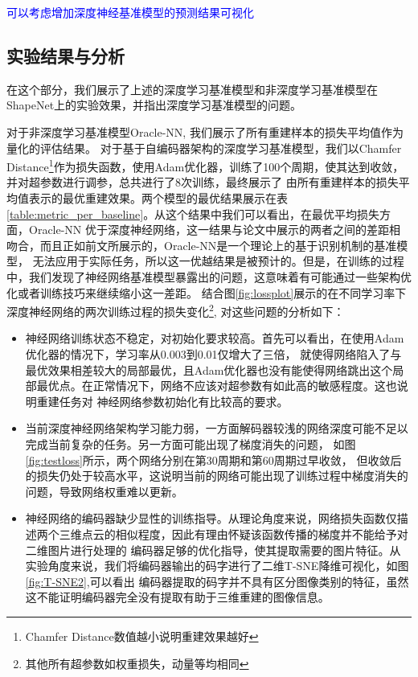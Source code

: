 \documentclass[bachelor, nocolorlinks, printoneside]{seuthesis} %
\newcommand\TODO[1]{\textcolor{blue}{#1}}
\begin{document}
\begin{Main}
\TODO{可以考虑增加深度神经基准模型的预测结果可视化}
\subsection{实验结果与分析}

在这个部分，我们展示了上述的深度学习基准模型和非深度学习基准模型在ShapeNet上的实验效果，并指出深度学习基准模型的问题。

对于非深度学习基准模型Oracle-NN, 我们展示了所有重建样本的损失平均值作为量化的评估结果。
对于基于自编码器架构的深度学习基准模型，我们以Chamfer Distance\footnote[2]{Chamfer Distance数值越小说明重建效果越好}作为损失函数，使用Adam优化器，训练了100个周期，使其达到收敛，并对超参数进行调参，总共进行了8次训练，最终展示了
由所有重建样本的损失平均值表示的最优重建效果。两个模型的最优结果展示在表\ref{table:metric_per_baseline}。从这个结果中我们可以看出，在最优平均损失方面，Oracle-NN
优于深度神经网络，这一结果与论文\cite{tatarchenko2019single}中展示的两者之间的差距相吻合，而且正如前文所展示的，Oracle-NN是一个理论上的基于识别机制的基准模型，
无法应用于实际任务，所以这一优越结果是被预计的。但是，在训练的过程中，我们发现了神经网络基准模型暴露出的问题，这意味着有可能通过一些架构优化或者训练技巧来继续缩小这一差距。
结合图\ref{fig:lossplot}展示的在不同学习率下深度神经网络的两次训练过程的损失变化\footnote[1]{其他所有超参数如权重损失，动量等均相同}, 对这些问题的分析如下：
\begin{itemize}
    \item 神经网络训练状态不稳定，对初始化要求较高。首先可以看出，在使用Adam优化器的情况下，学习率从0.003到0.01仅增大了三倍，
        就使得网络陷入了与最优效果相差较大的局部最优，且Adam优化器也没有能使得网络跳出这个局部最优点。在正常情况下，网络不应该对超参数有如此高的敏感程度。这也说明重建任务对
        神经网络参数初始化有比较高的要求。
    \item 当前深度神经网络架构学习能力弱，一方面解码器较浅的网络深度可能不足以完成当前复杂的任务。另一方面可能出现了梯度消失的问题，
    如图\ref{fig:testloss}所示，两个网络分别在第30周期和第60周期过早收敛，
    但收敛后的损失仍处于较高水平，这说明当前的网络可能出现了训练过程中梯度消失的问题，导致网络权重难以更新。
    
    \item 神经网络的编码器缺少显性的训练指导。从理论角度来说，网络损失函数仅描述两个三维点云的相似程度，因此有理由怀疑该函数传播的梯度并不能给予对二维图片进行处理的
    编码器足够的优化指导，使其提取需要的图片特征。从实验角度来说，我们将编码器输出的码字进行了二维T-SNE降维可视化，如图\ref{fig:T-SNE2},可以看出
    编码器提取的码字并不具有区分图像类别的特征，虽然这不能证明编码器完全没有提取有助于三维重建的图像信息。
\end{itemize}


\end{Main}
\end{document}
